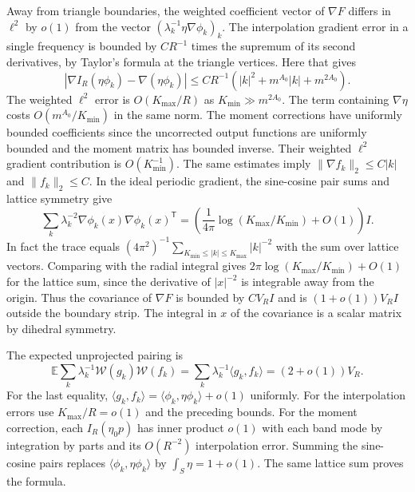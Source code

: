 \documentclass[11pt]{article}
\newcommand{\1}{\mathbf{1}}
\numberwithin{equation}{section}
\newcommand{\E}{\mathbb E}
\begin{document}
Away from triangle boundaries, the weighted coefficient vector
of \(\nabla F\) differs in \(\ell^2\) by \(o(1)\) from the vector
\((\lambda_k^{-1}\eta\nabla\phi_k)_k\). The interpolation
gradient error in a single frequency is bounded by \(CR^{-1}\)
times the supremum of its second derivatives, by Taylor's
formula at the triangle vertices. Here that gives
\[
 |\nabla I_R(\eta\phi_k)-\nabla(\eta\phi_k)|
 \le CR^{-1}(|k|^2+m^{A_0}|k|+m^{2A_0}).
\]
The weighted \(\ell^2\) error is \(O(K_{\max}/R)\) as
\(K_{\min}\gg m^{2A_0}\). The term containing \(\nabla\eta\)
costs \(O(m^{A_0}/K_{\min})\) in the same norm.
The moment corrections have uniformly bounded coefficients
since the uncorrected output functions are uniformly bounded
and the moment matrix has bounded inverse. Their weighted
\(\ell^2\) gradient contribution is \(O(K_{\min}^{-1})\).
The same estimates imply \(\|\nabla f_k\|_2\le C|k|\) and
\(\|f_k\|_2\le C\). In the ideal periodic gradient, the
sine-cosine pair sums and lattice symmetry give
\[
 \sum_k\lambda_k^{-2}\nabla\phi_k(x)\nabla\phi_k(x)^{\mathsf T}
  =\left(\frac{1}{4\pi}\log(K_{\max}/K_{\min})+O(1)\right) I .
\]
In fact the trace equals
\((4\pi^2)^{-1}\sum_{K_{\min}\le |k|\le K_{\max}}|k|^{-2}\)
with the sum over lattice vectors. Comparing with the radial
integral gives \(2\pi\log(K_{\max}/K_{\min})+O(1)\) for the
lattice sum, since the derivative of \(|x|^{-2}\) is integrable
away from the origin. Thus the covariance of \(\nabla F\) is
bounded by \(CV_R I\) and is \((1+o(1))V_R I\) outside the
boundary strip. The integral in \(x\) of the covariance is a
scalar matrix by dihedral symmetry.

The expected unprojected pairing is
\[
 \E\sum_k\lambda_k^{-1}\mathcal W(g_k)\mathcal W(f_k)
  =\sum_k\lambda_k^{-1}\langle g_k,f_k\rangle=(2+o(1))V_R .
\]
For the last equality,
\(\langle g_k,f_k\rangle=\langle\phi_k,\eta\phi_k\rangle+o(1)\)
uniformly. For the interpolation errors use \(K_{\max}/R=o(1)\)
and the preceding bounds. For the moment correction, each
\(I_R(\eta_0p)\) has inner product \(o(1)\) with each band
mode by integration by parts and its \(O(R^{-2})\)
interpolation error. Summing the sine-cosine pairs replaces
\(\langle\phi_k,\eta\phi_k\rangle\) by \(\int_S\eta=1+o(1)\).
The same lattice sum proves the formula.
\end{document}
